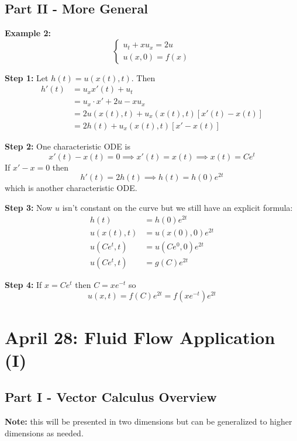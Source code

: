 \documentclass[12pt]{article}
\begin{document}
\subsection*{Part II - More General}
\textbf{Example 2:}
\[\begin{cases}
    u_t + xu_x = 2u\\
    u(x, 0) = f(x)
\end{cases}\]

\textbf{Step 1:} Let $h(t) = u(x(t), t)$. Then
\begin{align*}
    h'(t) &= u_x x'(t) + u_t\\
    &= u_x \cdot x' + 2u - xu_x\\
    &= 2u(x(t), t) + u_x(x(t), t)[x'(t) - x(t)]\\
    &= 2h(t) + u_x(x(t), t)[x'- x(t)]
\end{align*}

\textbf{Step 2:} One characteristic ODE is 
\[x'(t) - x(t) = 0 \implies x'(t) = x(t) \implies x(t) = Ce^t\]
If $x' - x = 0$ then 
\[h'(t) = 2h(t) \implies h(t) = h(0)e^{2t}\]
which is another characteristic ODE. 

\textbf{Step 3:} Now $u$ isn't constant on the curve but we still have an explicit formula:
\begin{align*}
    h(t) &= h(0)e^{2t}\\
    u(x(t), t) &= u(x(0), 0)e^{2t}\\
    u(Ce^t, t) &= u(Ce^0, 0)e^{2t}\\
    u(Ce^t, t) &= g(C)e^{2t}
\end{align*}

\textbf{Step 4:} If $x = Ce^t$ then $C = xe^{-t}$ so 
\[u(x, t) = f(C)e^{2t} = \boxed{f(xe^{-t})e^{2t}}\]

\section{April 28: Fluid Flow Application (I)}
\subsection*{Part I - Vector Calculus Overview}
\textbf{Note:} this will be presented in two dimensions but can be generalized to higher dimensions as needed. 
\end{document}
